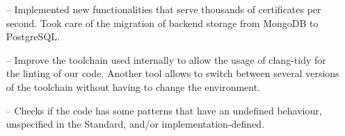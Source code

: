 \documentclass[10pt,a4paper]{altacv}
\begin{document}
\tagline{}

%

\begin{fullwidth}
\makecvheader
\end{fullwidth}

%





\begin{itemize}
    \setlength{\itemindent}{0.5em}
    \item[--]   \small{Implemented new functionalities that serve thousands of certificates per second. Took care of the migration of backend storage from MongoDB to PostgreSQL.}
\end{itemize}

\medskip




\begin{itemize}
    \setlength{\itemindent}{0.5em}
    \item[--]   \small{Improve the toolchain used internally to allow the usage of clang-tidy for the linting of our code. Another tool allows to switch between several versions of the toolchain without having to change the environment.}
\end{itemize}



\begin{itemize}
    \setlength{\itemindent}{0.5em}
    \item[--]   \small{Checks if the code has some patterns that have an undefined behaviour, unspecified in the Standard, and/or implementation-defined.}
\end{itemize}
\end{document}
